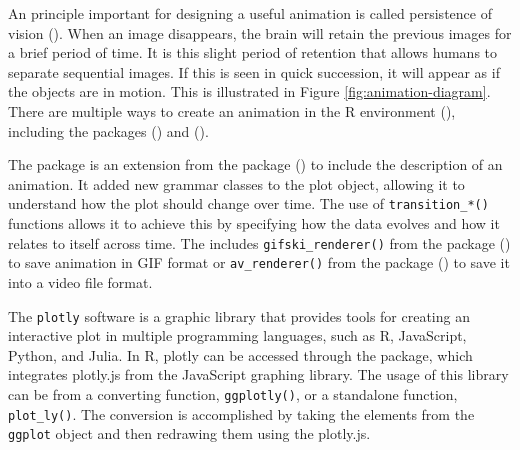 An principle important for designing a useful animation is called persistence of vision (\citet{animation-mechanic}). When an image disappears, the brain will retain the previous images for a brief period of time. It is this slight period of retention that allows humans to separate sequential images. If this is seen in quick succession, it will appear as if the objects are in motion. This is illustrated in Figure \ref{fig:animation-diagram}. There are multiple ways to create an animation in the R environment (\citet{r}), including the packages  (\citet{gganimate}) and  (\citet{plotly}).

The  package is an extension from the  package (\citet{ggplot2}) to include the description of an animation. It added new grammar classes to the plot object, allowing it to understand how the plot should change over time. The use of \texttt{transition\_*()} functions allows it to achieve this by specifying how the data evolves and how it relates to itself across time. The  includes \texttt{gifski\_renderer()} from the  package (\citet{gifski}) to save animation in GIF format or \texttt{av\_renderer()} from the  package (\citet{av}) to save it into a video file format.

The \texttt{plotly} software is a graphic library that provides tools for creating an interactive plot in multiple programming languages, such as R, JavaScript, Python, and Julia. In R, plotly can be accessed through the  package, which integrates plotly.js from the JavaScript graphing library. The usage of this library can be from a converting function, \texttt{ggplotly()}, or a standalone function, \texttt{plot\_ly()}. The conversion is accomplished by taking the elements from the \texttt{ggplot} object and then redrawing them using the plotly.js.

